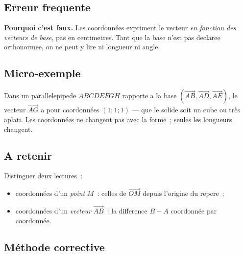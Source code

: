 

\subsection*{Erreur frequente}


\textbf{Pourquoi c'est faux.} Les coordonnées expriment le vecteur \emph{en
fonction des vecteurs de base}, pas en centimetres. Tant que la base n'est pas
declaree orthonormee, on ne peut y lire ni longueur ni angle.

\subsection*{Micro-exemple}

Dans un parallelepipede $ABCDEFGH$ rapporte a la base
$(\vec{AB},\vec{AD},\vec{AE})$, le vecteur $\vec{AG}$ a pour coordonnées
$(1;1;1)$ --- que le solide soit un cube ou très aplati. Les coordonnées ne
changent pas avec la forme~; seules les longueurs changent.

\subsection*{A retenir}

Distinguer deux lectures~:
\begin{itemize}
  \item coordonnées d'un \emph{point} $M$~: celles de $\vec{OM}$ depuis
        l'origine du repere~;
  \item coordonnées d'un \emph{vecteur} $\vec{AB}$~: la difference
        $B-A$ coordonnée par coordonnée.
\end{itemize}

\subsection*{Méthode corrective}

